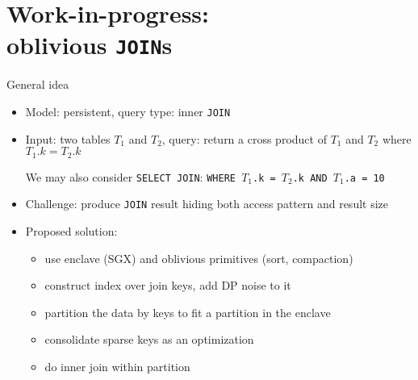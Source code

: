 \section{Work-in-progress: \\ oblivious \texttt{JOIN}s}

	\begin{frame}{General idea}

		\begin{itemize}
			\item<1->
				Model: \alert{persistent}, query type: \alert{inner \texttt{JOIN}}

			\item<2->
				Input: two tables $T_1$ and $T_2$, query: return a cross product of $T_1$ and $T_2$ where $T_1.k = T_2.k$ \\
				\begin{small}
					We may also consider \texttt{SELECT JOIN}: \texttt{WHERE $T_1$.k = $T_2$.k AND $T_1$.a = 10}
				\end{small}

			\item<3->
				\alert{Challenge}: produce \texttt{JOIN} result hiding both access pattern and result size

			\item<4->
				\alert{Proposed solution}:
				\begin{itemize}
					\item use enclave (SGX) and oblivious primitives (sort, compaction)
					\item construct index over join keys, add DP noise to it
					\item partition the data by keys to fit a partition in the enclave
					\item consolidate sparse keys as an optimization
					\item do inner join within partition
				\end{itemize}

		\end{itemize}

	\end{frame}

